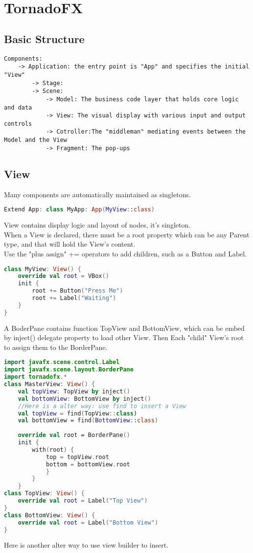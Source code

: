 \documentclass[12pt]{article}
\begin{document}
\section{TornadoFX}

\subsection{Basic Structure}
\begin{lstlisting}
Components:
	-> Application: the entry point is "App" and specifies the initial "View"
		-> Stage: 
		-> Scene:
			-> Model: The business code layer that holds core logic and data
			-> View: The visual display with various input and output controls
			-> Cotroller:The "middleman" mediating events between the Model and the View
			-> Fragment: The pop-ups
\end{lstlisting}
\subsection{View}
Many components are automatically maintained as singletons.

\begin{lstlisting}[language=Kotlin]
Extend App: class MyApp: App(MyView::class)
\end{lstlisting}
View contains display logic and layout of nodes, it's singleton.
\\
When a View is declared, there must be a root property which can be any Parent type, and that will hold the View's content.
\\
Use the "plus assign" += operators to add children, such as a Button and Label.

\begin{lstlisting}[language=Kotlin]
class MyView: View() {
	override val root = VBox()
	init {
		root += Button("Press Me")
		root += Label("Waiting")
	}
}
\end{lstlisting}
	A BoderPane contains function TopView and BottomView, which can be embed by inject() delegate property to load other View. Then Each "child" View's root to assign them to the BorderPane.

\begin{lstlisting}[language=Kotlin]
import javafx.scene.control.Label
import javafx.scene.layout.BorderPane
import tornadofx.*
class MasterView: View() {
	val topView: TopView by inject()
	val bottomView: BottomView by inject()
	//Here is a alter way: use find to insert a View
	val topView = find(TopView::class)
	val bottomView = find(BottomView::class)	
	
	override val root = BorderPane()
	init {
		with(root) {
			top = topView.root
			bottom = bottomView.root
			}
		}
	}
class TopView: View() {
	override val root = Label("Top View")
}
class BottomView: View() {
	override val root = Label("Bottom View")
}

\end{lstlisting}
Here is another alter way to use view builder to insert.
\end{document}
